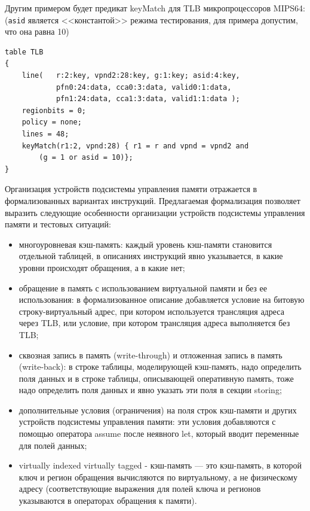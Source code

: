 Другим примером будет предикат keyMatch для TLB микропроцессоров MIPS64:
(\texttt{asid} является <<константой>> режима тестирования, для примера
допустим, что она равна 10)

\begin{verbatim}
table TLB
{
    line(   r:2:key, vpnd2:28:key, g:1:key; asid:4:key,
            pfn0:24:data, cca0:3:data, valid0:1:data,
            pfn1:24:data, cca1:3:data, valid1:1:data );
    regionbits = 0;
    policy = none;
    lines = 48;
    keyMatch(r1:2, vpnd:28) { r1 = r and vpnd = vpnd2 and
        (g = 1 or asid = 10)};
}
\end{verbatim}

Организация устройств подсистемы управления памяти отражается в формализованных вариантах инструкций. Предлагаемая формализация позволяет выразить следующие особенности организации устройств подсистемы управления памяти  и тестовых ситуаций:
\begin{itemize}
    \item многоуровневая кэш-память: каждый уровень кэш-памяти становится отдельной таблицей, в описаниях инструкций явно указывается, в какие уровни происходят обращения, а в какие нет;
    \item обращение в память с использованием виртуальной памяти и без ее использования: в формализованное описание добавляется условие на битовую строку-виртуальный адрес, при котором используется трансляция адреса через TLB, или условие, при котором трансляция адреса выполняется без TLB;
    \item сквозная запись в память (write-through) и отложенная запись в память (write-back): в строке таблицы, моделирующей кэш-память, надо определить поля данных и в строке таблицы, описывающей оперативную память, тоже надо определить поля данных и явно указать эти поля в секции storing;
    \item дополнительные условия (ограничения) на поля строк кэш-памяти и других устройств подсистемы управления памяти: эти условия добавляются с помощью оператора assume после неявного let, который вводит переменные для полей данных;
    \item virtually indexed virtually tagged - кэш-память --- это кэш-память, в которой ключ и регион обращения вычисляются по виртуальному, а не физическому адресу (соответствующие выражения для полей ключа и регионов указываются в операторах обращения к памяти).
\end{itemize}

